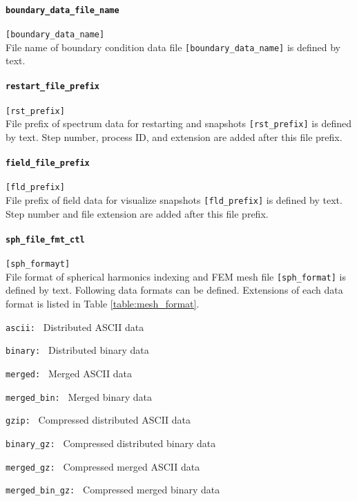 \paragraph{\tt boundary\_data\_file\_name}
\label{href_t:boundary_data_file_name}
\verb|[boundary_data_name]| \\
File name of boundary condition data file \verb|[boundary_data_name]| is defined by text. 

\paragraph{\tt restart\_file\_prefix}
\label{href_t:restart_file_prefix}
\verb|[rst_prefix]| \\
File prefix of spectrum data for restarting and snapshots \verb|[rst_prefix]| is defined by text. Step number, process ID, and extension are added after this file prefix.

\paragraph{\tt field\_file\_prefix}
\label{href_t:field_file_prefix}
\verb|[fld_prefix]| \\
File prefix of field data for visualize snapshots \verb|[fld_prefix]| is defined by text. Step number and file extension are  added after this file prefix.

\paragraph{\tt sph\_file\_fmt\_ctl}
\label{href_t:sph_file_fmt_ctl}
\verb|[sph_formayt]| \\
File format of spherical harmonics indexing and FEM mesh file \verb|[sph_format]| is defined by text. Following data formats can be defined. Extensions of each data format is listed in Table \ref{table:mesh_format}.
%
\begin{description}
\item{\tt ascii: }   Distributed ASCII data
\item{\tt binary: }  Distributed binary data
\item{\tt merged: }  Merged ASCII data
\item{\tt merged\_bin: }   Merged binary data
\item{\tt gzip: }            Compressed distributed ASCII data
\item{\tt binary\_gz: }      Compressed distributed binary data
\item{\tt merged\_gz: }      Compressed merged ASCII data
\item{\tt merged\_bin\_gz: } Compressed merged binary data
\end{description}
%

